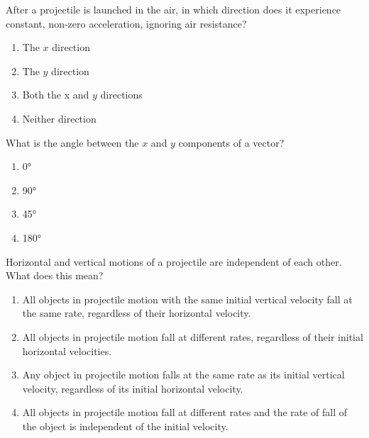 \documentclass[main-physics.tex]{subfiles}
\begin{document}
\clearpage

\begin{exercise} \label{sy5RGT}
    After a projectile is launched in the air, in which direction does it experience constant, non-zero acceleration, ignoring air resistance?

    \begin{enumerate}[label=\Alph*.]
        \item The $x$ direction
        \item The $y$ direction
        \item Both the x and $y$ directions
        \item Neither direction
    \end{enumerate}
\end{exercise}

\begin{exercise} \label{90PABl}
    What is the angle between the $x$ and $y$ components of a vector?

    \begin{enumerate}[label=\Alph*.]
        \item \ang{0}
        \item \ang{90}
        \item \ang{45}
        \item \ang{180}
    \end{enumerate}
\end{exercise}

\begin{exercise} \label{8I1QP6}
    Horizontal and vertical motions of a projectile are independent of each other. What does this mean?

\begin{enumerate}[label=\Alph*.]
    \item All objects in projectile motion with the same initial vertical velocity fall at the same rate, regardless of their horizontal velocity.
    \item All objects in projectile motion fall at different rates, regardless of their initial horizontal velocities.
    \item Any object in projectile motion falls at the same rate as its initial vertical velocity, regardless of its initial horizontal velocity.
    \item All objects in projectile motion fall at different rates and the rate of fall of the object is independent of the initial velocity.
\end{enumerate}
\end{exercise}
\end{document}
